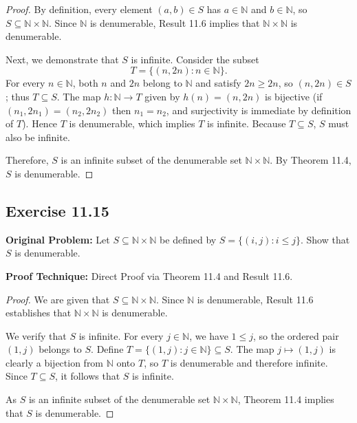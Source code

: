\documentclass[11pt, letterpaper]{article}
\theoremstyle{definition}
\theoremstyle{remark}
\begin{document}
\begin{proof}
By definition, every element $(a, b) \in S$ has $a \in \mathbb{N}$ and $b \in \mathbb{N}$, so $S \subseteq \mathbb{N} \times \mathbb{N}$. Since $\mathbb{N}$ is denumerable, Result 11.6 implies that $\mathbb{N} \times \mathbb{N}$ is denumerable.

Next, we demonstrate that $S$ is infinite. Consider the subset
\[
T = \{(n, 2n) : n \in \mathbb{N}\}.
\]
For every $n \in \mathbb{N}$, both $n$ and $2n$ belong to $\mathbb{N}$ and satisfy $2n \ge 2n$, so $(n, 2n) \in S$; thus $T \subseteq S$. The map $h : \mathbb{N} \to T$ given by $h(n) = (n, 2n)$ is bijective (if $(n_1, 2n_1) = (n_2, 2n_2)$ then $n_1 = n_2$, and surjectivity is immediate by definition of $T$). Hence $T$ is denumerable, which implies $T$ is infinite. Because $T \subseteq S$, $S$ must also be infinite.

Therefore, $S$ is an infinite subset of the denumerable set $\mathbb{N} \times \mathbb{N}$. By Theorem 11.4, $S$ is denumerable.
\end{proof}

\subsection{Exercise 11.15}

\textbf{Original Problem:} Let $S \subseteq \mathbb{N} \times \mathbb{N}$ be defined by $S = \{(i, j) : i \le j\}$. Show that $S$ is denumerable.

\textbf{Proof Technique:} Direct Proof via Theorem 11.4 and Result 11.6.

\begin{proof}
We are given that $S \subseteq \mathbb{N} \times \mathbb{N}$. Since $\mathbb{N}$ is denumerable, Result 11.6 establishes that $\mathbb{N} \times \mathbb{N}$ is denumerable.

We verify that $S$ is infinite. For every $j \in \mathbb{N}$, we have $1 \le j$, so the ordered pair $(1, j)$ belongs to $S$. Define $T = \{(1, j) : j \in \mathbb{N}\} \subseteq S$. The map $j \mapsto (1, j)$ is clearly a bijection from $\mathbb{N}$ onto $T$, so $T$ is denumerable and therefore infinite. Since $T \subseteq S$, it follows that $S$ is infinite.

As $S$ is an infinite subset of the denumerable set $\mathbb{N} \times \mathbb{N}$, Theorem 11.4 implies that $S$ is denumerable.
\end{proof}

\end{document}
